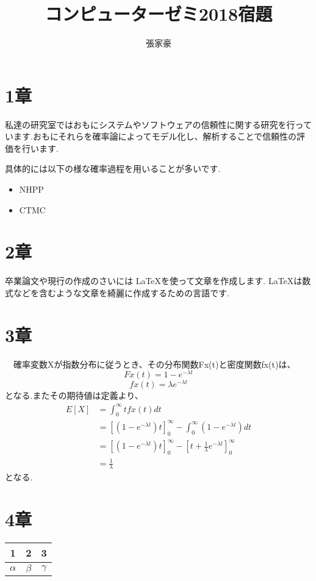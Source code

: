 \documentclass[a4paper,12pt]{article}
\title{コンピューターゼミ2018宿題}
\author{張家豪}
\begin{document}
\maketitle
\section{1章}
\par 私達の研究室ではおもにシステムやソフトウェアの信頼性に関する研究を行っています.おもにそれらを確率論によってモデル化し、解析することで信頼性の評価を行います.
\par  具体的には以下の様な確率過程を用いることが多いです.
\begin{itemize}
\item NHPP
\item CTMC
\end{itemize}
\section{2章}
\par 卒業論文や現行の作成のさいには \LaTeX を使って文章を作成します. \LaTeX は数式などを含むような文章を綺麗に作成するための言語です.

\section{3章}
\par　確率変数Xが指数分布に従うとき、その分布関数Fx(t)と密度関数fx(t)は、
\begin{equation}
  Fx(t) = 1 - e^{-\lambda t}
\end{equation}
\begin{equation}
  fx(t) = \lambda e^{-\lambda t}
\end{equation}
となる.またその期待値は定義より、
\begin{equation}
\begin{split}
  E[X] &= \int_0^{\infty}tfx(t) dt\nonumber\\
       &= [(1-e^{-\lambda t}) t]^\infty_{0}-\int_0^{\infty}(1-e^{-\lambda t}) dt\nonumber\\
       &= [(1-e^{-\lambda t}) t]^\infty_{0}-[t+\frac{1}{\lambda} e^{-\lambda t}]^\infty_{0}\nonumber\\
       &= \frac{1}{\lambda}
\end{split}
\end{equation}
となる.
\section{4章}
\centering
\begin{tabular}{|c|c|c|}
\toprule
 1& 2& 3\\
\midrule
$ \alpha $ & $\beta$ & $\gamma $\\
\bottomrule
\end{tabular}
\end{document}
